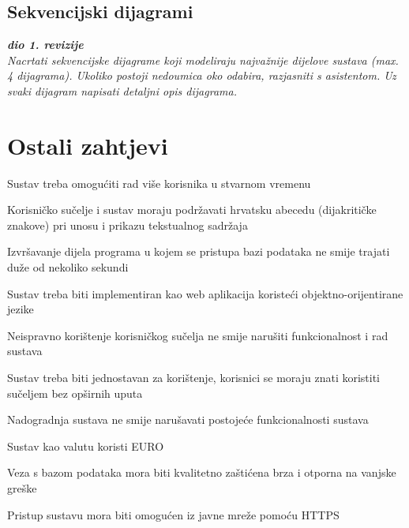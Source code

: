 			\subsection{Sekvencijski dijagrami}
				
				\textbf{\textit{dio 1. revizije}}\\
				
				\textit{Nacrtati sekvencijske dijagrame koji modeliraju najvažnije dijelove sustava (max. 4 dijagrama). Ukoliko postoji nedoumica oko odabira, razjasniti s asistentom. Uz svaki dijagram napisati detaljni opis dijagrama.}
				\eject
	
		\section{Ostali zahtjevi}
		
			\item Sustav treba omogućiti rad više korisnika u stvarnom vremenu
			\item Korisničko sučelje i sustav moraju podržavati hrvatsku abecedu (dijakritičke znakove) pri unosu i prikazu tekstualnog sadržaja
			\item Izvršavanje dijela programa u kojem se pristupa bazi podataka ne smije trajati duže od nekoliko sekundi
			\item Sustav treba biti implementiran kao web aplikacija koristeći objektno-orijentirane jezike
			\item Neispravno korištenje korisničkog sučelja ne smije narušiti funkcionalnost i rad sustava
			\item Sustav treba biti jednostavan za korištenje, korisnici se moraju znati koristiti sučeljem bez opširnih uputa
			\item Nadogradnja sustava ne smije narušavati postojeće funkcionalnosti sustava
			\item Sustav kao valutu koristi EURO
			\item Veza s bazom podataka mora biti kvalitetno zaštićena brza i otporna na vanjske greške
			\item Pristup sustavu mora biti omogućen iz javne mreže pomoću HTTPS